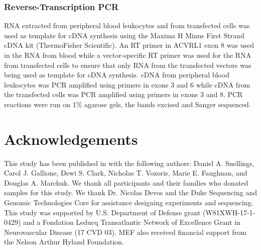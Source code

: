 \subsubsection{Reverse-Transcription PCR}
RNA extracted from peripheral blood leukocytes and from transfected cells was used as template for cDNA synthesis using the Maxima H Minus First Strand cDNA kit (ThermoFisher Scientific).  An RT primer in ACVRL1 exon 8 was used in the RNA from blood while a vector-specific RT primer was used for the RNA from transfected cells to ensure that only RNA from the transfected vectors was being used as template for cDNA synthesis. cDNA from peripheral blood leukocytes was PCR amplified using primers in exons 3 and 6 while cDNA from the transfected cells was PCR amplified using primers in exons 3 and 8.  PCR reactions were run on 1\% agarose gels, the bands excised and Sanger sequenced. 

\section{Acknowledgements}
This study has been published in  \citep{snellings2019} with the following authors: Daniel A. Snellings, Carol J. Gallione, Dewi S. Clark, Nicholas T. Vozoris, Marie E. Faughnan, and Douglas A. Marchuk. We thank all participants and their families who donated samples for this study. We thank Dr. Nicolas Devos and the Duke Sequencing and Genomic Technologies Core for assistance designing experiments and sequencing. This study was supported by U.S. Department of Defense grant (W81XWH-17-1-0429) and a Fondation Leducq Transatlantic Network of Excellence Grant in Neurovascular Disease (17 CVD 03). MEF also received financial support from the Nelson Arthur Hyland Foundation. 